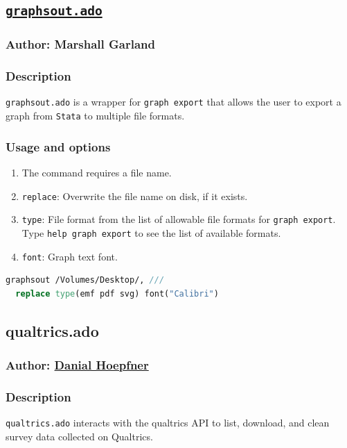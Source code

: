 {\subsection{\href{https://github.com/GibsonConsult/graphsout}{\texttt{graphsout.ado}}}
\subsubsection{Author: Marshall Garland}
\subsubsection{Description}
\texttt{graphsout.ado} is a wrapper for \texttt{graph export} that allows the user to export a graph from \texttt{Stata} to multiple file formats.
\subsubsection{Usage and options}
\begin{enumerate}
\item The command requires a file name.
\item \texttt{replace}: Overwrite the file name on disk, if it exists.
\item \texttt{type}: File format from the list of allowable file formats for \texttt{graph export}. Type \texttt{help graph export} to see the list of available formats.
\item \texttt{font}: Graph text font.
\end{enumerate}
\begin{lstlisting}[language=Stata, numbers=none]
graphsout /Volumes/Desktop/, ///
  replace type(emf pdf svg) font("Calibri")
\end{lstlisting}

\subsection{qualtrics.ado}
\subsubsection{Author: \href{mailto:dhoepfner@gibsonconsult.com}{Danial Hoepfner}}
\subsubsection{Description}
\texttt{qualtrics.ado} interacts with the qualtrics API to list, download, and clean survey data collected on Qualtrics.
}
